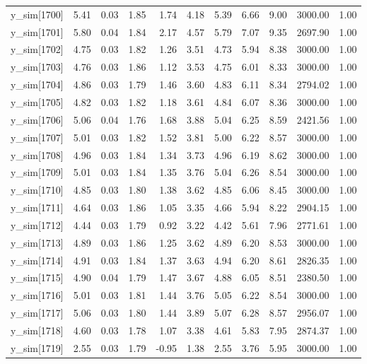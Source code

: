 \begin{table}[ht]
\begin{tabular}{rrrrrrrrrrr}
  y\_sim[1700] & 5.41 & 0.03 & 1.85 & 1.74 & 4.18 & 5.39 & 6.66 & 9.00 & 3000.00 & 1.00 \\ 
  y\_sim[1701] & 5.80 & 0.04 & 1.84 & 2.17 & 4.57 & 5.79 & 7.07 & 9.35 & 2697.90 & 1.00 \\ 
  y\_sim[1702] & 4.75 & 0.03 & 1.82 & 1.26 & 3.51 & 4.73 & 5.94 & 8.38 & 3000.00 & 1.00 \\ 
  y\_sim[1703] & 4.76 & 0.03 & 1.86 & 1.12 & 3.53 & 4.75 & 6.01 & 8.33 & 3000.00 & 1.00 \\ 
  y\_sim[1704] & 4.86 & 0.03 & 1.79 & 1.46 & 3.60 & 4.83 & 6.11 & 8.34 & 2794.02 & 1.00 \\ 
  y\_sim[1705] & 4.82 & 0.03 & 1.82 & 1.18 & 3.61 & 4.84 & 6.07 & 8.36 & 3000.00 & 1.00 \\ 
  y\_sim[1706] & 5.06 & 0.04 & 1.76 & 1.68 & 3.88 & 5.04 & 6.25 & 8.59 & 2421.56 & 1.00 \\ 
  y\_sim[1707] & 5.01 & 0.03 & 1.82 & 1.52 & 3.81 & 5.00 & 6.22 & 8.57 & 3000.00 & 1.00 \\ 
  y\_sim[1708] & 4.96 & 0.03 & 1.84 & 1.34 & 3.73 & 4.96 & 6.19 & 8.62 & 3000.00 & 1.00 \\ 
  y\_sim[1709] & 5.01 & 0.03 & 1.84 & 1.35 & 3.76 & 5.04 & 6.26 & 8.54 & 3000.00 & 1.00 \\ 
  y\_sim[1710] & 4.85 & 0.03 & 1.80 & 1.38 & 3.62 & 4.85 & 6.06 & 8.45 & 3000.00 & 1.00 \\ 
  y\_sim[1711] & 4.64 & 0.03 & 1.86 & 1.05 & 3.35 & 4.66 & 5.94 & 8.22 & 2904.15 & 1.00 \\ 
  y\_sim[1712] & 4.44 & 0.03 & 1.79 & 0.92 & 3.22 & 4.42 & 5.61 & 7.96 & 2771.61 & 1.00 \\ 
  y\_sim[1713] & 4.89 & 0.03 & 1.86 & 1.25 & 3.62 & 4.89 & 6.20 & 8.53 & 3000.00 & 1.00 \\ 
  y\_sim[1714] & 4.91 & 0.03 & 1.84 & 1.37 & 3.63 & 4.94 & 6.20 & 8.61 & 2826.35 & 1.00 \\ 
  y\_sim[1715] & 4.90 & 0.04 & 1.79 & 1.47 & 3.67 & 4.88 & 6.05 & 8.51 & 2380.50 & 1.00 \\ 
  y\_sim[1716] & 5.01 & 0.03 & 1.81 & 1.44 & 3.76 & 5.05 & 6.22 & 8.54 & 3000.00 & 1.00 \\ 
  y\_sim[1717] & 5.06 & 0.03 & 1.80 & 1.44 & 3.89 & 5.07 & 6.28 & 8.57 & 2956.07 & 1.00 \\ 
  y\_sim[1718] & 4.60 & 0.03 & 1.78 & 1.07 & 3.38 & 4.61 & 5.83 & 7.95 & 2874.37 & 1.00 \\ 
  y\_sim[1719] & 2.55 & 0.03 & 1.79 & -0.95 & 1.38 & 2.55 & 3.76 & 5.95 & 3000.00 & 1.00 \\ 

\end{tabular}
\end{table}
